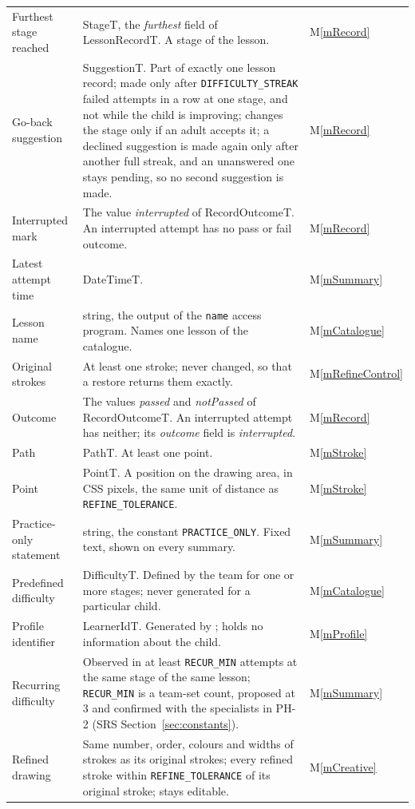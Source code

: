 \documentclass[12pt, titlepage]{article}
\newcommand{\mref}[1]{M\ref{#1}}
\begin{document}
{\begin{longtable}{@{}>{\raggedright\arraybackslash}p{}
>{\raggedright\arraybackslash}p{}
>{\raggedright\arraybackslash}p{}@{}}
Furthest stage reached & StageT, the \emph{furthest} field of LessonRecordT. A stage of the lesson. & \mref{mRecord}\\
Go-back suggestion & SuggestionT. Part of exactly one lesson record; made only after \texttt{DIFFICULTY\_\allowbreak STREAK} failed attempts in a row at one stage, and not while the child is improving; changes the stage only if an adult accepts it; a declined suggestion is made again only after another full streak, and an unanswered one stays pending, so no second suggestion is made. & \mref{mRecord}\\
Interrupted mark & The value \emph{interrupted} of RecordOutcomeT. An interrupted attempt has no pass or fail outcome. & \mref{mRecord}\\
Latest attempt time & DateTimeT. & \mref{mSummary}\\
Lesson name & string, the output of the \texttt{name} access program. Names one lesson of the catalogue. & \mref{mCatalogue}\\
Original strokes & At least one stroke; never changed, so that a restore returns them exactly. & \mref{mRefineControl}\\
Outcome & The values \emph{passed} and \emph{notPassed} of RecordOutcomeT. An interrupted attempt has neither; its \emph{outcome} field is \emph{interrupted}. & \mref{mRecord}\\
Path & PathT. At least one point. & \mref{mStroke}\\
Point & PointT. A position on the drawing area, in CSS pixels, the same unit of distance as \texttt{REFINE\_\allowbreak TOLERANCE}. & \mref{mStroke}\\
Practice-only statement & string, the constant \texttt{PRACTICE\_\allowbreak ONLY}. Fixed text, shown on every summary. & \mref{mSummary}\\
Predefined difficulty & DifficultyT. Defined by the team for one or more stages; never generated for a particular child. & \mref{mCatalogue}\\
Profile identifier & LearnerIdT. Generated by \progname{}; holds no information about the child. & \mref{mProfile}\\
Recurring difficulty & Observed in at least \texttt{RECUR\_\allowbreak MIN} attempts at the same stage of the same lesson; \texttt{RECUR\_\allowbreak MIN} is a team-set count, proposed at 3 and confirmed with the specialists in PH-2 (SRS Section~\ref{sec:constants}). & \mref{mSummary}\\
Refined drawing & Same number, order, colours and widths of strokes as its original strokes; every refined stroke within \texttt{REFINE\_\allowbreak TOLERANCE} of its original stroke; stays editable. & \mref{mCreative}\\

\end{longtable}}
\end{document}
